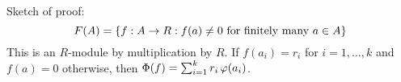 \begin{pf}[source=Primary Source Material]
    Sketch of proof:
    \begin{equation*}
        F(A) = \left\{{f: A \rightarrow R : f(a) \neq 0 \textrm{ for finitely many } a \in A}\right\}
    \end{equation*}
    This is an $ R $-module by multiplication by $ R $. \vsp
    If $ f(a_{i}) = r_{i} $ for $ i = 1, \dots, k $ and $ f(a) = 0 $ otherwise,
    then $ \Phi(f) = \sum_{i=1}^{k} r_{i}\operatorname{\varphi}(a_{i}) $.
\end{pf}
